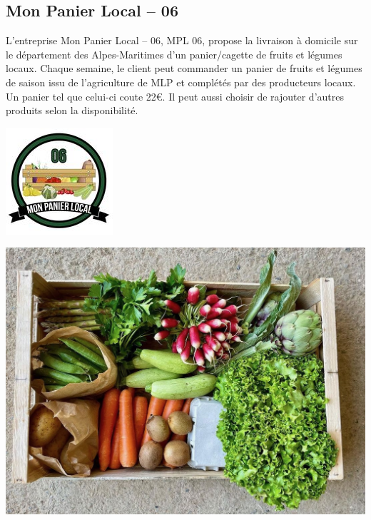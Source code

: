 \documentclass[11pt]{article}
\begin{document}
\subsection{Mon Panier Local – 06}

\hspace{-0.6cm}\begin{minipage}{.68\textwidth}\parindent17pt


 L’entreprise Mon Panier Local – 06, MPL 06, propose la livraison à domicile sur le département des Alpes-Maritimes d’un panier/cagette de fruits et légumes locaux. Chaque semaine, le client peut commander un panier de fruits et légumes de saison issu de l’agriculture de MLP et complétés par des producteurs locaux. Un panier tel que celui-ci coute 22\euro. Il peut aussi choisir de rajouter d’autres produits selon la disponibilité. 

\end{minipage}%
\hfill
\begin{minipage}{.25\textwidth}%
\includegraphics[scale=0.7]{mpl06.jpeg}
\end{minipage}


\begin{center}
\includegraphics[scale=0.15]{panier.jpeg}
\end{center}
\end{document}
